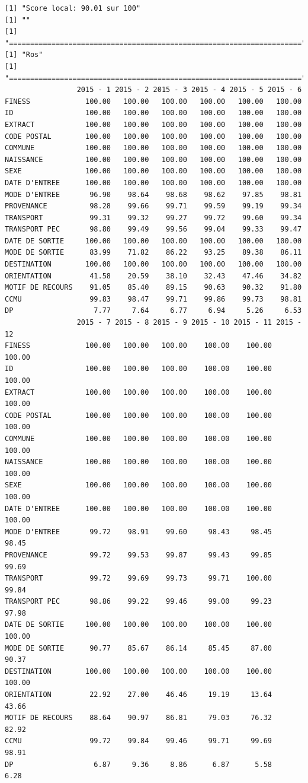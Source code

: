 \documentclass[]{article}
\begin{document}
\begin{verbatim}
[1] "Score local: 90.01 sur 100"
[1] ""
[1] "====================================================================="
[1] "Ros"
[1] "====================================================================="
                 2015 - 1 2015 - 2 2015 - 3 2015 - 4 2015 - 5 2015 - 6
FINESS             100.00   100.00   100.00   100.00   100.00   100.00
ID                 100.00   100.00   100.00   100.00   100.00   100.00
EXTRACT            100.00   100.00   100.00   100.00   100.00   100.00
CODE POSTAL        100.00   100.00   100.00   100.00   100.00   100.00
COMMUNE            100.00   100.00   100.00   100.00   100.00   100.00
NAISSANCE          100.00   100.00   100.00   100.00   100.00   100.00
SEXE               100.00   100.00   100.00   100.00   100.00   100.00
DATE D'ENTREE      100.00   100.00   100.00   100.00   100.00   100.00
MODE D'ENTREE       96.90    98.64    98.68    98.62    97.85    98.81
PROVENANCE          98.28    99.66    99.71    99.59    99.19    99.34
TRANSPORT           99.31    99.32    99.27    99.72    99.60    99.34
TRANSPORT PEC       98.80    99.49    99.56    99.04    99.33    99.47
DATE DE SORTIE     100.00   100.00   100.00   100.00   100.00   100.00
MODE DE SORTIE      83.99    71.82    86.22    93.25    89.38    86.11
DESTINATION        100.00   100.00   100.00   100.00   100.00   100.00
ORIENTATION         41.58    20.59    38.10    32.43    47.46    34.82
MOTIF DE RECOURS    91.05    85.40    89.15    90.63    90.32    91.80
CCMU                99.83    98.47    99.71    99.86    99.73    98.81
DP                   7.77     7.64     6.77     6.94     5.26     6.53
                 2015 - 7 2015 - 8 2015 - 9 2015 - 10 2015 - 11 2015 - 12
FINESS             100.00   100.00   100.00    100.00    100.00    100.00
ID                 100.00   100.00   100.00    100.00    100.00    100.00
EXTRACT            100.00   100.00   100.00    100.00    100.00    100.00
CODE POSTAL        100.00   100.00   100.00    100.00    100.00    100.00
COMMUNE            100.00   100.00   100.00    100.00    100.00    100.00
NAISSANCE          100.00   100.00   100.00    100.00    100.00    100.00
SEXE               100.00   100.00   100.00    100.00    100.00    100.00
DATE D'ENTREE      100.00   100.00   100.00    100.00    100.00    100.00
MODE D'ENTREE       99.72    98.91    99.60     98.43     98.45     98.45
PROVENANCE          99.72    99.53    99.87     99.43     99.85     99.69
TRANSPORT           99.72    99.69    99.73     99.71    100.00     99.84
TRANSPORT PEC       98.86    99.22    99.46     99.00     99.23     97.98
DATE DE SORTIE     100.00   100.00   100.00    100.00    100.00    100.00
MODE DE SORTIE      90.77    85.67    86.14     85.45     87.00     90.37
DESTINATION        100.00   100.00   100.00    100.00    100.00    100.00
ORIENTATION         22.92    27.00    46.46     19.19     13.64     43.66
MOTIF DE RECOURS    88.64    90.97    86.81     79.03     76.32     82.92
CCMU                99.72    99.84    99.46     99.71     99.69     98.91
DP                   6.87     9.36     8.86      6.87      5.58      6.28
\end{verbatim}
\end{document}
